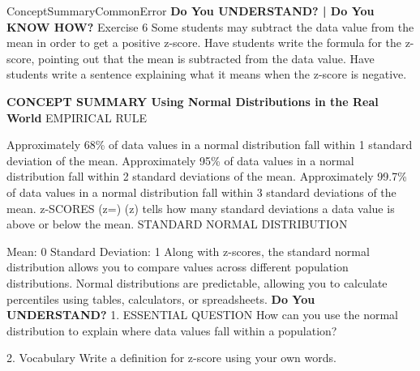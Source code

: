 \documentclass{article}
\newenvironment{concept-summary}{}{}    %
\newenvironment{te-addendum}[2]{}{}     %
\newcommand{\answer}[1]{}               %
\newcommand{\placeholder}[2]{}          %
\begin{document}
\begin{te-addendum}{ConceptSummary}{CommonError}
\textbf{Do You UNDERSTAND? | Do You KNOW HOW?}
Exercise 6 Some students may subtract the data value from the mean in order to get a positive z-score. Have students write the formula for the z-score, pointing out that the mean is subtracted from the data value. Have students write a sentence explaining what it means when the z-score is negative.
\end{te-addendum}
\begin{concept-summary}
\textbf{CONCEPT SUMMARY Using Normal Distributions in the Real World}
EMPIRICAL RULE
\placeholder{graph}{Red normal curve with rectangular grid and peak at mu. Horizontal labels mu-4sigma, mu-2sigma, mu, mu+2sigma, mu+4sigma; vertical guides every sigma. Blue central region within one sigma, pale green from one to two sigma, pink from two to three sigma. Braces below show 68 percent over mu±sigma, 95 percent over mu±2sigma, 99.7 percent over mu±3sigma. No vertical scale or arrows.}
Approximately 68\% of data values in a normal distribution fall within 1 standard deviation of the mean.
Approximately 95\% of data values in a normal distribution fall within 2 standard deviations of the mean.
Approximately 99.7\% of data values in a normal distribution fall within 3 standard deviations of the mean.
z-SCORES
(z=)
(z) tells how many standard deviations a data value is above or below the mean.
STANDARD NORMAL DISTRIBUTION
\placeholder{graph}{Red standard normal bell curve with peak at 0, horizontal labels -4 to 4 at unit increments. Vertical red line at z about -1.34; pink area to the left. Vertical grid lines at integers; no vertical scale or arrows.}
Mean: 0
Standard Deviation: 1
Along with z-scores, the standard normal distribution allows you to compare values across different population distributions.
Normal distributions are predictable, allowing you to calculate percentiles using tables, calculators, or spreadsheets.
\textbf{Do You UNDERSTAND?}
1. ESSENTIAL QUESTION How can you use the normal distribution to explain where data values fall within a population?
\answer{The area under the normal distribution curve tells what percent of the data is one, two, three, or more standard deviations away from the mean.}
2. Vocabulary Write a definition for z-score using your own words.
\answer{The z-score counts how many standard deviations a data value is from the mean, because it divides the distance from the mean by the distance of a standard deviation.}

\end{concept-summary}
\end{document}
